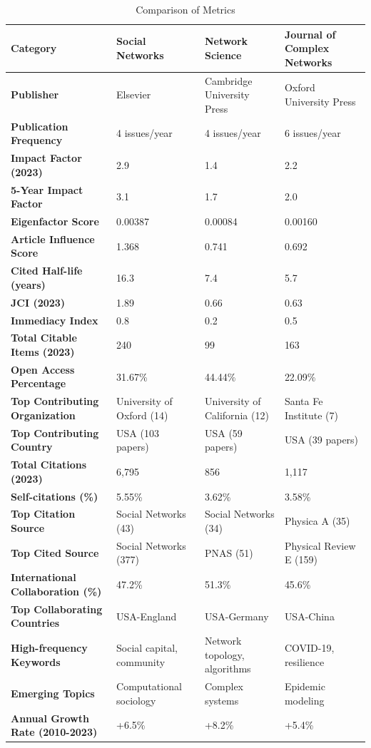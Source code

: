 \documentclass[twocolumn]{article}
\begin{document}
	\begin{table}[htbp]
		\tiny
		\caption{Comparison of Metrics}\label{table.tab2}
		\begin{tabularx}{\textwidth}{|p{5cm}|X|X|X|}
			\hline
			\textbf{Category} & \textbf{Social Networks} & \textbf{Network Science} & \textbf{Journal of Complex Networks} \\ \hline
			\textbf{Publisher} & Elsevier & Cambridge University Press & Oxford University Press \\ \hline
			\textbf{Publication Frequency} & 4 issues/year & 4 issues/year & 6 issues/year \\ \hline
			\textbf{Impact Factor (2023)} & 2.9 & 1.4 & 2.2 \\ \hline
			\textbf{5-Year Impact Factor} & 3.1 & 1.7 & 2.0 \\ \hline
			\textbf{Eigenfactor Score} & 0.00387 & 0.00084 & 0.00160 \\ \hline
			\textbf{Article Influence Score} & 1.368 & 0.741 & 0.692 \\ \hline
			\textbf{Cited Half-life (years)} & 16.3 & 7.4 & 5.7 \\ \hline
			\textbf{JCI (2023)} & 1.89 & 0.66 & 0.63 \\ \hline
			\textbf{Immediacy Index} & 0.8 & 0.2 & 0.5 \\ \hline
			\textbf{Total Citable Items (2023)} & 240 & 99 & 163 \\ \hline
			\textbf{Open Access Percentage} & 31.67\% & 44.44\% & 22.09\% \\ \hline
			\textbf{Top Contributing Organization} & University of Oxford (14) & University of California (12) & Santa Fe Institute (7) \\ \hline
			\textbf{Top Contributing Country} & USA (103 papers) & USA (59 papers) & USA (39 papers) \\ \hline
			\textbf{Total Citations (2023)} & 6,795 & 856 & 1,117 \\ \hline
			\textbf{Self-citations (\%)} & 5.55\% & 3.62\% & 3.58\% \\ \hline
			\textbf{Top Citation Source} & Social Networks (43) & Social Networks (34) & Physica A (35) \\ \hline
			\textbf{Top Cited Source} & Social Networks (377) & PNAS (51) & Physical Review E (159) \\ \hline
			\textbf{International Collaboration (\%)} & 47.2\% & 51.3\% & 45.6\% \\ \hline
			\textbf{Top Collaborating Countries} & USA-England & USA-Germany & USA-China \\ \hline
			\textbf{High-frequency Keywords} & Social capital, community & Network topology, algorithms & COVID-19, resilience \\ \hline
			\textbf{Emerging Topics} & Computational sociology & Complex systems & Epidemic modeling \\ \hline
			\textbf{Annual Growth Rate (2010-2023)} & +6.5\% & +8.2\% & +5.4\% \\ \hline
		\end{tabularx}	
		
	\end{table}
	
\end{document}

